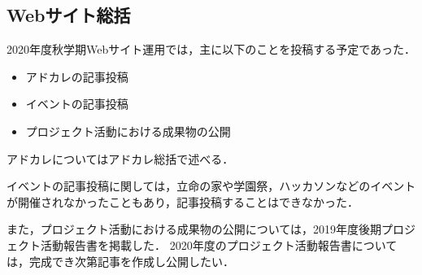 \subsection*{Webサイト総括}



2020年度秋学期Webサイト運用では，主に以下のことを投稿する予定であった．

\begin{itemize}
  \item アドカレの記事投稿
  \item イベントの記事投稿
  \item プロジェクト活動における成果物の公開
\end{itemize}

アドカレについてはアドカレ総括で述べる．

イベントの記事投稿に関しては，立命の家や学園祭，ハッカソンなどのイベントが開催されなかったこともあり，記事投稿することはできなかった．

また，プロジェクト活動における成果物の公開については，2019年度後期プロジェクト活動報告書を掲載した．
2020年度のプロジェクト活動報告書については，完成でき次第記事を作成し公開したい．

